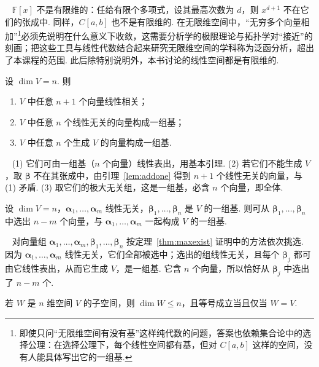 \documentclass[lang=cn,10.5pt,scheme=chinese,toc=twocol,section,chinesefont=nofont,
twoside,citestyle=gb7714-2015,bibstyle=gb7714-2015]{elegantbook}
\DeclareRobustCommand{\textbf}[1]{{\lnsemiboldlatin\lnsemiboldcjk #1}}
\newcommand{\vv}[1]{\boldsymbol{#1}}
\numberwithin{equation}{section}   %
\newcommand*{\lnlabel}[1]{{\sffamily\bfseries\color{black}#1}}
\renewenvironment{proof}{%
	\par\noindent\lnlabel{\proofname}\;\ \color{black!90}\cfs}{\par}
\renewenvironment{remark}{\noindent\lnlabel{\remarkname}\ }{\par}
\begin{document}
\begin{remark}
  $\mathbb{F}[x]$ 不是有限维的：任给有限个多项式，设其最高次数为 $d$，则 $x^{d+1}$ 不在它们的张成中. 同样，$C[a,b]$ 也不是有限维的. 在无限维空间中，“无穷多个向量相加”\footnote{即使只问“无限维空间有没有基”这样纯代数的问题，答案也依赖集合论中的选择公理：在选择公理下，每个线性空间都有基，但对 $C[a,b]$ 这样的空间，没有人能具体写出它的一组基.}必须先说明在什么意义下收敛，这需要分析学的极限理论与拓扑学对“接近”的刻画；把这些工具与线性代数结合起来研究无限维空间的学科称为\textbf{泛函分析}，超出了本课程的范围. \textbf{此后除特别说明外，本书讨论的线性空间都是有限维的.}
\end{remark}

\begin{theorem}
  \label{thm:ndimbasis}
  设 $\dim V=n$. 则
  \begin{enumerate}
    \item $V$ 中任意 $n+1$ 个向量线性相关；
    \item $V$ 中任意 $n$ 个线性无关的向量构成一组基；
    \item $V$ 中任意 $n$ 个生成 $V$ 的向量构成一组基.
  \end{enumerate}
\end{theorem}
\begin{proof}
  (1) 它们可由一组基（$n$ 个向量）线性表出，用基本引理.
  (2) 若它们不能生成 $V$，取 $\vv\beta$ 不在其张成中，由引理~\ref{lem:addone} 得到 $n+1$ 个线性无关的向量，与 (1) 矛盾.
  (3) 取它们的极大无关组，这是一组基，必含 $n$ 个向量，即全体.
\end{proof}

\begin{theorem}[基扩张定理]
  设 $\dim V=n$，$\vv{\alpha}_1,\ldots,\vv{\alpha}_m$ 线性无关，$\vv\beta_1,\ldots,\vv\beta_n$ 是 $V$ 的一组基. 则可从 $\vv\beta_1,\ldots,\vv\beta_n$ 中选出 $n-m$ 个向量，与 $\vv{\alpha}_1,\ldots,\vv{\alpha}_m$ 一起构成 $V$ 的一组基.
\end{theorem}
\begin{proof}
  对向量组 $\vv\alpha_1,\ldots,\vv\alpha_m,\vv\beta_1,\ldots,\vv\beta_n$ 按定理~\ref{thm:maxexist} 证明中的方法依次挑选. 因为 $\vv\alpha_1,\ldots,\vv\alpha_m$ 线性无关，它们全部被选中；选出的组线性无关，且每个 $\vv\beta_j$ 都可由它线性表出，从而它生成 $V$，是一组基. 它含 $n$ 个向量，所以恰好从 $\vv\beta_j$ 中选出了 $n-m$ 个.
\end{proof}

\begin{corollary}
  若 $W$ 是 $n$ 维空间 $V$ 的子空间，则 $\dim W\le n$，且等号成立当且仅当 $W=V$.
\end{corollary}
\end{document}
